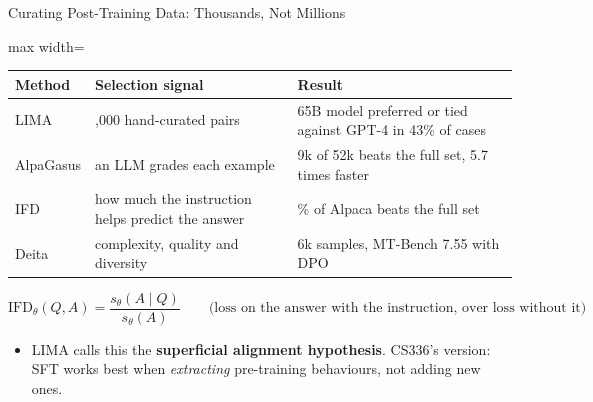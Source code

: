 \begin{frame}{Curating Post-Training Data: Thousands, Not Millions}
    \begin{center}
    \small
    \begin{adjustbox}{max width=\linewidth}\begin{tabular}{l>{\raggedright\arraybackslash}p{5.3cm}>{\raggedright\arraybackslash}p{5.6cm}}
        \toprule
        \textbf{Method} & \textbf{Selection signal} & \textbf{Result} \\
        \midrule
        LIMA & 1,000 hand-curated pairs & 65B model preferred or tied against GPT-4 in 43\% of cases \\
        AlpaGasus & an LLM grades each example & 9k of 52k beats the full set, 5.7 times faster \\
        IFD & how much the instruction helps predict the answer & 5\% of Alpaca beats the full set \\
        Deita & complexity, quality and diversity & 6k samples, MT-Bench 7.55 with DPO \\
        \bottomrule
    \end{tabular}\end{adjustbox}
    \end{center}
    \[
        \mathrm{IFD}_\theta(Q,A)=\frac{s_\theta(A\mid Q)}{s_\theta(A)}
        \qquad\text{(loss on the answer with the instruction, over loss without it)}
    \]
    \begin{itemize}\itemsep0.4em
        \item LIMA calls this the \textbf{superficial alignment hypothesis}. CS336's version: SFT works best when \emph{extracting} pre-training behaviours, not adding new ones.
    \end{itemize}
\end{frame}

